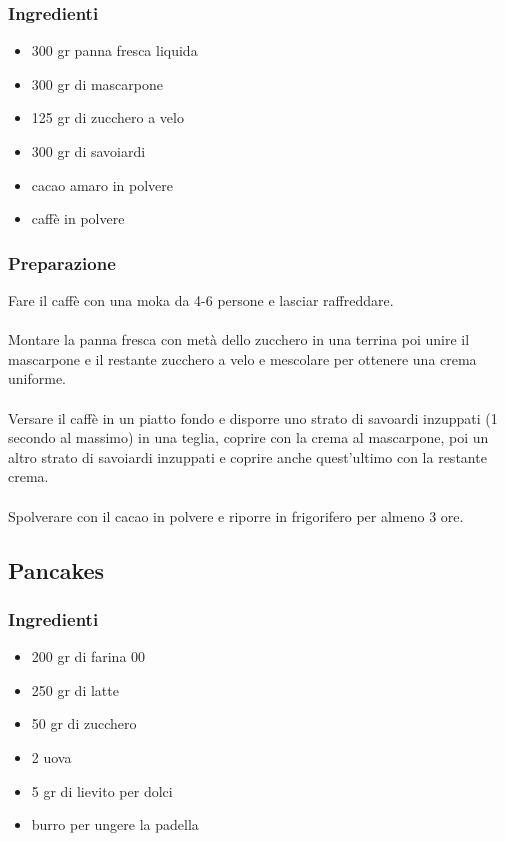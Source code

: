 \documentclass[12pt, a4paper]{article}
\begin{document}
\subsubsection{Ingredienti}
\begin{itemize}
\item   300 gr panna fresca liquida
\item	300 gr di mascarpone
\item	125 gr di zucchero a velo
\item	300 gr di savoiardi
\item	cacao amaro in polvere
\item	caffè in polvere
\end{itemize}

\subsubsection{Preparazione}
	Fare il caffè con una moka da 4-6 persone e lasciar raffreddare.\\\\
	Montare la panna fresca con metà dello zucchero in una terrina poi
	unire il mascarpone e il restante zucchero a velo e mescolare per ottenere
	una crema uniforme.\\\\
	Versare il caffè in un piatto fondo e disporre uno strato di savoardi
	inzuppati (1 secondo al massimo) in una teglia, coprire con la crema
	al mascarpone, poi un altro strato di savoiardi inzuppati e coprire
	anche quest'ultimo con la restante crema.\\\\
	Spolverare con il cacao in polvere e riporre in frigorifero per almeno 3 ore.	
\clearpage

\subsection{Pancakes}

\subsubsection{Ingredienti}
\begin{itemize}
\item   200 gr di farina 00 
\item	250 gr di latte
\item	50 gr di zucchero
\item	2 uova
\item	5 gr di lievito per dolci
\item	burro per ungere la padella
\end{itemize}
\end{document}
